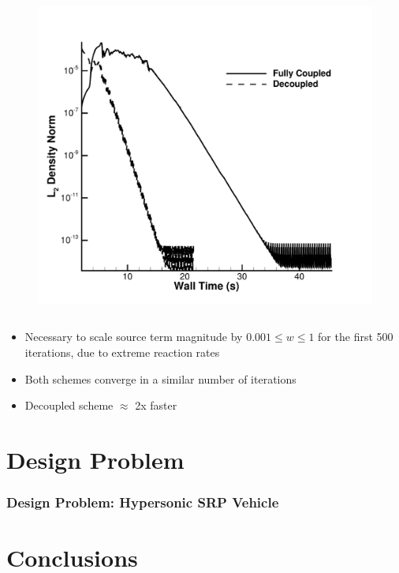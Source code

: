 \documentclass{beamer}
\begin{document}
\begin{frame}
\begin{columns}[t]
\begin{column}{0.5\textwidth}
\begin{figure}[h!]
	  \includegraphics[width=\textwidth]{figures/cone_walltime}
        \end{figure}
      \end{column}
    \end{columns}
  \begin{itemize}
    \item Necessary to scale source term magnitude by $0.001 \leq w \leq 1$ 
      for the first 500 iterations, due to extreme reaction rates
    \item Both schemes converge in a similar number of iterations
    \item Decoupled scheme $\approx$ 2x faster
  \end{itemize}
\end{frame}

\section{Design Problem}
\begin{frame}
  \frametitle{Design Problem: Hypersonic SRP Vehicle}
\end{frame}

\section{Conclusions}
\end{document}
